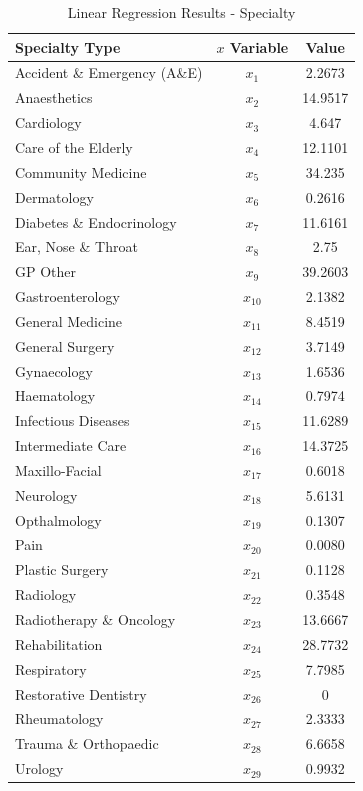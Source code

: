 \documentclass[../thesis.tex]{subfiles}
\begin{document}
\begin{table}[h!]
    \centering
    \begin{tabular}{lcc} \toprule
      Specialty Type   & $x$ Variable & Value \\ \midrule
      Accident \& Emergency (A\&E) & $x_{1}$ & 2.2673\\ 
      Anaesthetics & $x_{2}$ & 14.9517 \\
      Cardiology & $x_{3}$ & 4.647\\
      Care of the Elderly & $x_{4}$ & 12.1101 \\
      Community Medicine & $x_{5}$ & 34.235\\
      Dermatology & $x_{6}$ & 0.2616\\
      Diabetes \& Endocrinology & $x_{7}$ & 11.6161\\
      Ear, Nose \& Throat & $x_{8}$ &2.75 \\
      GP Other & $x_{9}$ & 39.2603\\
      Gastroenterology & $x_{10}$ &2.1382 \\
      General Medicine & $x_{11}$ & 8.4519\\
      General Surgery & $x_{12}$ & 3.7149\\
      Gynaecology & $x_{13}$ & 1.6536\\
      Haematology & $x_{14}$ & 0.7974\\
      Infectious Diseases & $x_{15}$ &11.6289 \\
      Intermediate Care & $x_{16}$ &14.3725 \\
      Maxillo-Facial & $x_{17}$ & 0.6018\\
      Neurology & $x_{18}$ & 5.6131 \\
      Opthalmology & $x_{19}$ &0.1307 \\
      Pain & $x_{20}$ & 0.0080\\
      Plastic Surgery & $x_{21}$ & 0.1128\\
      Radiology & $x_{22}$ & 0.3548\\
      Radiotherapy \& Oncology & $x_{23}$ & 13.6667\\
      Rehabilitation & $x_{24}$ & 28.7732\\
      Respiratory & $x_{25}$ & 7.7985\\
      Restorative Dentistry & $x_{26}$ & 0\\
      Rheumatology & $x_{27}$ & 2.3333\\
      Trauma \& Orthopaedic & $x_{28}$ & 6.6658\\
      Urology & $x_{29}$ &0.9932 \\\bottomrule
    \end{tabular}
    \caption{Linear Regression Results - Specialty}
    \label{tab:linreg-specialty}
\end{table}
\end{document}
